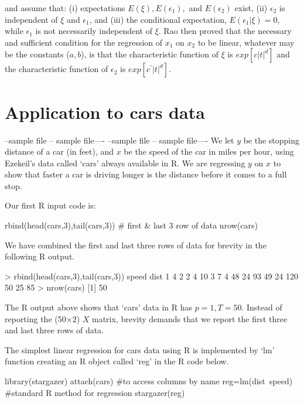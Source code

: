 \documentclass[12pt]{article}
\begin{document}
\cite{Rao47} and \cite{Rao49} 
assume that: (i) expectations $E(\xi), E(\epsilon_1),$ 
and $E(\epsilon_2)$ exist, (ii) $\epsilon_2$ is independent of $\xi$ and $\epsilon_1$,
and (iii) the conditional expectation, $E(\epsilon_1 |\xi)=0$, while $\epsilon_1$ is not necessarily
independent of $\xi$.  Rao then proved that
the necessary and sufficient condition for
the regression of $x_1$ on
$x_2$ to be linear, whatever may be the constants ($a, b$), is that
the characteristic function of  $\xi$ is $exp[c|t|^d]$ 
and the characteristic function of  $\epsilon_2$ is $exp[c^\prime|t|^d]$.

\section{Application to cars data}
--sample file -- sample file----
--sample file -- sample file----
We let $y$ be the stopping distance of a car (in feet),
and $x$ be the speed of the car in miles per hour, using 
Ezekeil's data called `cars' always available in R. 
We are regressing $y$ on $x$ to show that faster a car is driving
longer is the distance before it comes to a full stop.

Our first R input code is:
\begin{Sinput}
rbind(head(cars,3),tail(cars,3)) # first \& last 3 row of data
nrow(cars)
\end{Sinput}
We have combined the first and last three rows of data for brevity in
the following R output.
\begin{Soutput}
> rbind(head(cars,3),tail(cars,3)) 
     speed dist
1      4    2
2      4   10
3      7    4
48    24   93
49    24  120
50    25   85
> nrow(cars)
[1] 50
\end{Soutput}

The R output above shows that `cars' data in R has $p=1, T=50$.
Instead of reporting the  (50$\times 2$) $X$ matrix,
brevity demands that we report the first three and last three rows of data. 

The simplest linear regression for cars data using R
is implemented by `lm' function creating an R object called `reg'
in the R code below.
\begin{Sinput}
library(stargazer)	
attach(cars) #to access columns by name
reg=lm(dist~speed) #standard R method for regression
stargazer(reg)
\end{Sinput}
\end{document}
